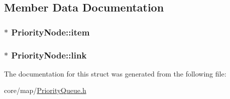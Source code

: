 \subsection{Member Data Documentation}
\hypertarget{structPriorityNode_a4db59d39e0c8c22f7dc1bb15039dd717}{
\subsubsection[{item}]{$\ast$ Priority\-Node\-::item}}\label{structPriorityNode_a4db59d39e0c8c22f7dc1bb15039dd717}
\hypertarget{structPriorityNode_a14b07ac4aa2d34e510f5183447698cc8}{
\subsubsection[{link}]{$\ast$ Priority\-Node\-::link}}\label{structPriorityNode_a14b07ac4aa2d34e510f5183447698cc8}


The documentation for this struct was generated from the following file\-:\begin{DoxyCompactItemize}
\item 
core/map/\hyperlink{PriorityQueue_8h}{Priority\-Queue.\-h}\end{DoxyCompactItemize}
